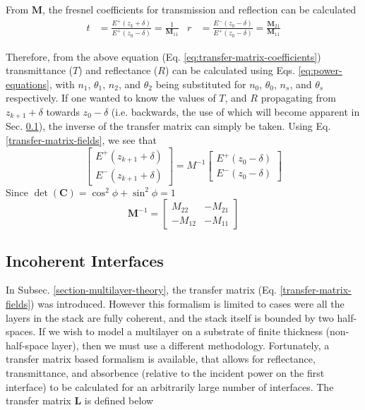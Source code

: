 \documentclass[10pt,a4paper,portrait]{report}
\begin{document}
\noindent
From $\mathbf{M}$, the fresnel coefficients for transmission and reflection can be calculated
\begin{align}\label{eq:transfer-matrix-coefficients}
  t &= \frac{E^+\left( z_k + \delta \right)}{E^+\left( z_0 - \delta \right)} 
     = \frac{1}{\mathbf{M}_{11}} &
  r &= \frac{E^-\left( z_0 - \delta \right)}{E^+\left( z_0 - \delta \right)}
     = \frac{\mathbf{M}_{21}}{\mathbf{M}_{11}}
\end{align}

\noindent
Therefore, from the above equation (Eq. \ref{eq:transfer-matrix-coefficients}) transmittance ($T$) and reflectance ($R$) can be calculated using Eqs. \ref{eq:power-equations}, with $n_1$, $\theta_1$, $n_2$, and $\theta_2$ being substituted for $n_0$, $\theta_0$, $n_s$, and $\theta_s$ respectively.
If one wanted to know the values of $T$, and $R$ propagating from $z_{k+1} + \delta$ towards $z_0 - \delta$ (i.e. backwards, the use of which will become apparent in Sec. \ref{Inchorent-Interfaces}), the inverse of the transfer matrix can simply be taken.
Using Eq. \ref{transfer-matrix-fields}, we see that
\begin{equation}
\begin{bmatrix}
  E^+\left( z_{k+1} + \delta \right) \\
  E^-\left( z_{k+1} + \delta \right)
\end{bmatrix} =
M^{-1}
\begin{bmatrix}
  E^+\left( z_0 - \delta \right) \\
  E^-\left( z_0 - \delta \right)
\end{bmatrix} 
\end{equation}
Since $\det\left(\mathbf{C}\right)=\cos^2 \phi + \sin^2 \phi = 1$
\begin{equation}
\mathbf{M}^{-1} = 
\begin{bmatrix}
  M_{22} & -M_{21} \\
  -M_{12} & -M_{11} 
\end{bmatrix}
\end{equation}

\subsection{Incoherent Interfaces}\label{Inchorent-Interfaces}
In Subsec. \ref{section-multilayer-theory}, the transfer matrix (Eq. \ref{transfer-matrix-fields}) was introduced. However this formalism is limited to cases were all the layers in the stack are fully coherent, and the stack itself is bounded by two half-spaces. If we wish to model a multilayer on a substrate of finite thickness (non-half-space layer), then we must use a different methodology. Fortunately, a transfer matrix based formalism is available, that allows for reflectance, transmittance, and absorbence (relative to the incident power on the first interface) to be calculated for an arbitrarily large number of interfaces. The transfer matrix $\mathbf{L}$ is defined below
\end{document}
